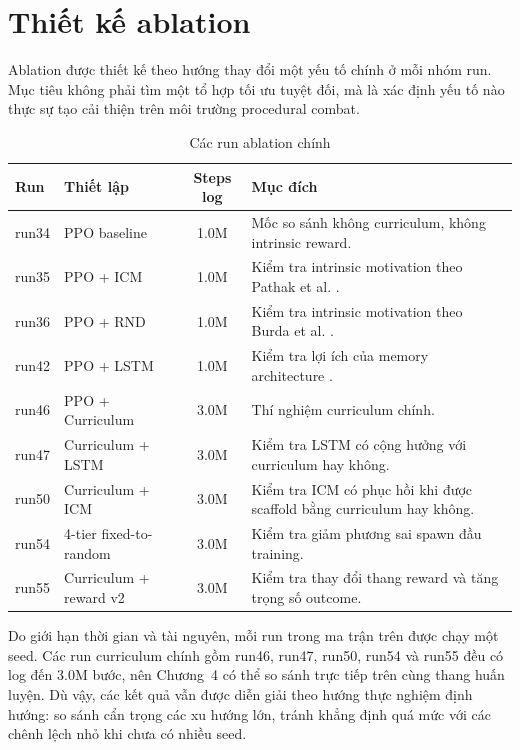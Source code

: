 \section{Thiết kế ablation}

Ablation được thiết kế theo hướng thay đổi một yếu tố chính ở mỗi nhóm run. Mục tiêu không phải tìm một tổ hợp tối ưu tuyệt đối, mà là xác định yếu tố nào thực sự tạo cải thiện trên môi trường procedural combat.

\begin{table}[H]
    \centering
    \small
    \caption{Các run ablation chính}
    \label{tab:ablation_matrix_design}
    \begin{tabular}{|p{2cm}|p{5.1cm}|c|p{5.2cm}|}
        \hline
        \textbf{Run} & \textbf{Thiết lập} & \textbf{Steps log} & \textbf{Mục đích} \\
        \hline
        run34 & PPO baseline & 1.0M & Mốc so sánh không curriculum, không intrinsic reward. \\
        \hline
        run35 & PPO + ICM & 1.0M & Kiểm tra intrinsic motivation theo Pathak et al. \cite{Pathak2017}. \\
        \hline
        run36 & PPO + RND & 1.0M & Kiểm tra intrinsic motivation theo Burda et al. \cite{Burda2018}. \\
        \hline
        run42 & PPO + LSTM & 1.0M & Kiểm tra lợi ích của memory architecture \cite{Hochreiter1997}. \\
        \hline
        run46 & PPO + Curriculum & 3.0M & Thí nghiệm curriculum chính. \\
        \hline
        run47 & Curriculum + LSTM & 3.0M & Kiểm tra LSTM có cộng hưởng với curriculum hay không. \\
        \hline
        run50 & Curriculum + ICM & 3.0M & Kiểm tra ICM có phục hồi khi được scaffold bằng curriculum hay không. \\
        \hline
        run54 & 4-tier fixed-to-random & 3.0M & Kiểm tra giảm phương sai spawn đầu training. \\
        \hline
        run55 & Curriculum + reward v2 & 3.0M & Kiểm tra thay đổi thang reward và tăng trọng số outcome. \\
        \hline
    \end{tabular}
\end{table}

Do giới hạn thời gian và tài nguyên, mỗi run trong ma trận trên được chạy một seed. Các run curriculum chính gồm run46, run47, run50, run54 và run55 đều có log đến 3.0M bước, nên Chương~4 có thể so sánh trực tiếp trên cùng thang huấn luyện. Dù vậy, các kết quả vẫn được diễn giải theo hướng thực nghiệm định hướng: so sánh cẩn trọng các xu hướng lớn, tránh khẳng định quá mức với các chênh lệch nhỏ khi chưa có nhiều seed.

